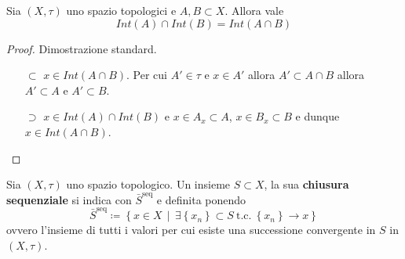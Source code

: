 \begin{proposition}
	Sia $(X,\tau)$ uno spazio topologici e $A, B \subset X$. Allora vale 
	\begin{equation*}
		Int(A) \cap Int(B) = Int(A \cap B)
	\end{equation*}
\end{proposition}
\begin{proof}
	Dimostrazione standard.
	\begin{enumerate}
		\item[$\subset$]  $x \in Int(A \cap B)$. Per cui $A' \in \tau$ e $x \in A'$ allora $A' \subset A \cap B$ allora $A' \subset A$ e $A' \subset B$.  
		\item[$\supset$] $x \in Int(A) \cap Int(B)$ e $x \in A_x \subset A$, $x \in B_x \subset B$ e dunque $x \in Int(A \cap B)$.
	\end{enumerate}
\end{proof}


\begin{definition}
	Sia $(X,\tau)$ uno spazio topologico. Un insieme $S \subset X$, la sua \textbf{chiusura sequenziale} si indica con $\bar{S}^\text{seq}$ e definita ponendo
	\begin{equation*}
		\bar{S}^\text{seq} \coloneqq \left\{x \in X \,\middle|\, \exists\left\{x_n\right\} \subset S\ \text{t.c.}\ \left\{x_n\right\} \rightarrow x \right\}
	\end{equation*}
	ovvero l'insieme di tutti i valori per cui esiste una successione convergente in $S$ in $(X, \tau)$.
\end{definition}

